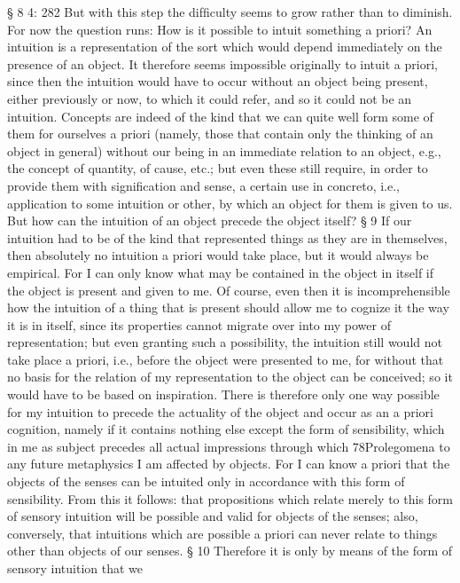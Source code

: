 § 8
4: 282
But with this step the difﬁculty seems to grow rather than to diminish.
For now the question runs: How is it possible to intuit something a priori? An
intuition is a representation of the sort which would depend immediately
on the presence of an object. It therefore seems impossible originally to
intuit a priori, since then the intuition would have to occur without an
object being present, either previously or now, to which it could refer,
and so it could not be an intuition. Concepts are indeed of the kind that
we can quite well form some of them for ourselves a priori (namely, those
that contain only the thinking of an object in general) without our being
in an immediate relation to an object, e.g., the concept of quantity, of
cause, etc.; but even these still require, in order to provide them with
signiﬁcation and sense, a certain use in concreto, i.e., application to some
intuition or other, by which an object for them is given to us. But how
can the intuition of an object precede the object itself?
§ 9
If our intuition had to be of the kind that represented things as they are
in themselves, then absolutely no intuition a priori would take place, but it
would always be empirical. For I can only know what may be contained in
the object in itself if the object is present and given to me. Of course, even
then it is incomprehensible how the intuition of a thing that is present
should allow me to cognize it the way it is in itself, since its properties
cannot migrate over into my power of representation; but even granting
such a possibility, the intuition still would not take place a priori, i.e.,
before the object were presented to me, for without that no basis for
the relation of my representation to the object can be conceived; so it
would have to be based on inspiration. There is therefore only one way
possible for my intuition to precede the actuality of the object and occur
as an a priori cognition, namely if it contains nothing else except the form of
sensibility, which in me as subject precedes all actual impressions through which
78Prolegomena to any future metaphysics
I am affected by objects. For I can know a priori that the objects of the
senses can be intuited only in accordance with this form of sensibility.
From this it follows: that propositions which relate merely to this form of
sensory intuition will be possible and valid for objects of the senses; also,
conversely, that intuitions which are possible a priori can never relate to
things other than objects of our senses.
§ 10
Therefore it is only by means of the form of sensory intuition that we
